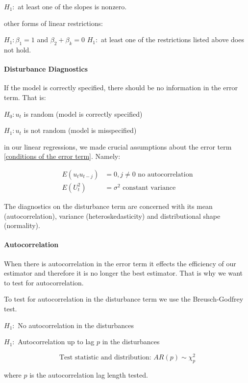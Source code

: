 \documentclass[11pt]{article}
\begin{document}
$H_1:$ at least one of the slopes is nonzero.

other forms of linear restrictions:

$H_1: \beta_1=1$ and $\beta_2 + \beta_k=0$
$H_1:$ at least one of the restrictions listed above does not hold.

\paragraph{Disturbance Diagnostics} \mbox{}

If the model is correctly specified, there should be no information in the error term. That is:

$H_0: u_t$ is random (model is correctly specified)

$H_1: u_t$ is not random (model is misspecified)

in our linear regressions, we made crucial assumptions about the error term \eqref{conditions of the error term}. Namely:

\begin{align*}
    E(u_tu_{t-j}) &= 0, j\neq0 \text{ no autocorrelation} \\
    E(U_t^2) &= \sigma^2 \text{ constant variance }
\end{align*}

The diagnostics on the disturbance term are concerned with its mean (autocorrelation), variance (heteroskedasticity) and distributional shape (normality).

\paragraph{Autocorrelation} \mbox{}

When there is autocorrelation in the error term it effects the efficiency of our estimator and therefore it is no longer the best estimator. That is why we want to test for autocorrelation.

To test for autocorrelation in the disturbance term we use the Breusch-Godfrey test.

\begin{mdframed}
    $H_1:$ No autocorrelation in the disturbances

    $H_1:$ Autocorrelation up to lag $p$ in the disturbances

    \[\text{Test statistic and distribution: } AR(p) \sim \chi_p^2\]

    where $p$ is the autocorrelation lag length tested.
\end{mdframed}
\end{document}
